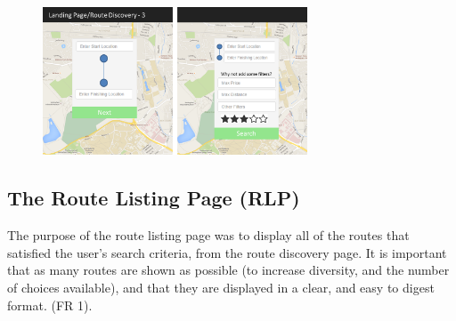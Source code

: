 \begin{figure}[!ht]
	\begin{center}
		\includegraphics[width=0.70\textwidth]{images/ui-landing-3.png}
	\end{center}
	\vspace{-10mm}
\end{figure}


\newpage 

\subsection{The Route Listing Page (RLP)}
The purpose of the route listing page was to display all of the routes that satisfied the user's search criteria, from the route discovery page. It is important that as many routes are shown as possible (to increase diversity, and the number of choices available), and that they are displayed in a clear, and easy to digest format. (FR 1).

